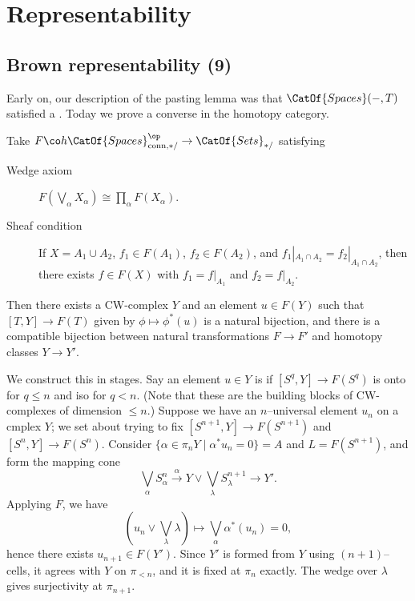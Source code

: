 
\chapter{Representability}




\section{Brown representability (9)}

Early on, our description of the pasting lemma was that $\CatOf{Spaces}(-, T)$ satisfied a .  Today we prove a converse in the homotopy category.

\begin{theorem}[Brown]
Take $F\co h\CatOf{Spaces}^{\op}_{\mathrm{conn}, */} \to \CatOf{Sets}_{*/}$ satisfying
\begin{description}
    \item[Wedge axiom] $F(\bigvee_\alpha X_\alpha) \cong \prod_\alpha F(X_\alpha)$.
    \item[Sheaf condition] If $X = A_1 \cup A_2$, $f_1 \in F(A_1)$, $f_2 \in F(A_2)$, and $f_1|_{A_1 \cap A_2} = f_2|_{A_1 \cap A_2}$, then there exists $f \in F(X)$ with $f_1 = f|_{A_1}$ and $f_2 = f|_{A_2}$.
\end{description}
Then there exists a CW-complex $Y$ and an element $u \in F(Y)$ such that $[T, Y] \to F(T)$ given by $\phi \mapsto \phi^*(u)$ is a natural bijection, and there is a compatible bijection between natural transformations $F \to F'$ and homotopy classes $Y \to Y'$.
\end{theorem}

We construct this in stages.  Say an element $u \in Y$ is  if $[S^q, Y] \to F(S^q)$ is onto for $q \le n$ and iso for $q < n$.  (Note that these are the building blocks of CW-complexes of dimension $\le n$.)  Suppose we have an $n$--universal element $u_n$ on a cmplex $Y$; we set about trying to fix $[S^{n+1}, Y] \to F(S^{n+1})$ and $[S^n, Y] \to F(S^n)$.  Consider $\{\alpha \in \pi_n Y \mid \alpha^* u_n = 0\} = A$ and $L = F(S^{n+1})$, and form the mapping cone \[\bigvee_\alpha S^n_\alpha \xrightarrow{\alpha} Y \vee \bigvee_\lambda S^{n+1}_\lambda \to Y'.\]  Applying $F$, we have \[(u_n \vee \bigvee_\lambda \lambda) \mapsto \bigvee_\alpha \alpha^*(u_n) = 0,\] hence there exists $u_{n+1} \in F(Y')$.  Since $Y'$ is formed from $Y$ using $(n+1)$--cells, it agrees with $Y$ on $\pi_{< n}$, and it is fixed at $\pi_n$ exactly.  The wedge over $\lambda$ gives surjectivity at $\pi_{n+1}$.

